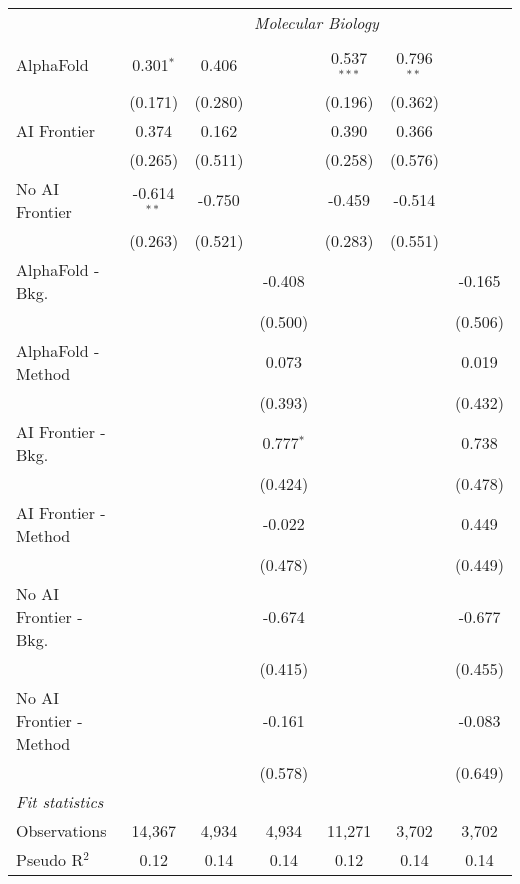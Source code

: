 \begin{tabular}{lcccccc}
 & \multicolumn{6}{c}{\textit{Molecular Biology}} \\ \\
   AlphaFold               & 0.301$^{*}$   & 0.406   &             & 0.537$^{***}$ & 0.796$^{**}$ &   \\   
                           & (0.171)       & (0.280) &             & (0.196)       & (0.362)      &   \\   
   AI Frontier             & 0.374         & 0.162   &             & 0.390         & 0.366        &   \\   
                           & (0.265)       & (0.511) &             & (0.258)       & (0.576)      &   \\   
   No AI Frontier          & -0.614$^{**}$ & -0.750  &             & -0.459        & -0.514       &   \\   
                           & (0.263)       & (0.521) &             & (0.283)       & (0.551)      &   \\   
   AlphaFold - Bkg.        &               &         & -0.408      &               &              & -0.165\\   
                           &               &         & (0.500)     &               &              & (0.506)\\   
   AlphaFold - Method      &               &         & 0.073       &               &              & 0.019\\   
                           &               &         & (0.393)     &               &              & (0.432)\\   
   AI Frontier - Bkg.      &               &         & 0.777$^{*}$ &               &              & 0.738\\   
                           &               &         & (0.424)     &               &              & (0.478)\\   
   AI Frontier - Method    &               &         & -0.022      &               &              & 0.449\\   
                           &               &         & (0.478)     &               &              & (0.449)\\   
   No AI Frontier - Bkg.   &               &         & -0.674      &               &              & -0.677\\   
                           &               &         & (0.415)     &               &              & (0.455)\\   
   No AI Frontier - Method &               &         & -0.161      &               &              & -0.083\\   
                           &               &         & (0.578)     &               &              & (0.649)\\   
   \midrule
   \emph{Fit statistics}\\
   Observations            & 14,367        & 4,934   & 4,934       & 11,271        & 3,702        & 3,702\\  
   Pseudo R$^2$            & 0.12          & 0.14    & 0.14        & 0.12          & 0.14         & 0.14\\  
   

\end{tabular}
